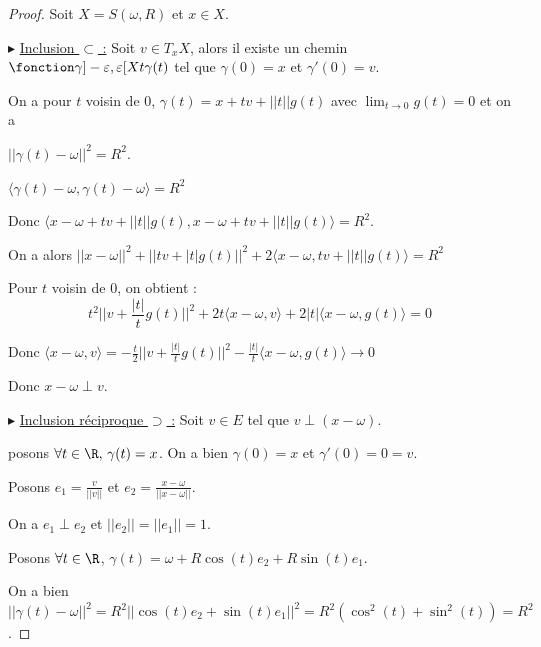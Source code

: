 \begin{proof}
    Soit $X = S(\omega, R)$ et $x \in X$.

    $\blacktriangleright$ \uline{Inclusion $\subset$ :} Soit $v \in T_xX$, alors il existe un chemin $\fonction \gamma {]- \varepsilon, \varepsilon[}{X}{t}{\gamma(t)}$
    tel que $\gamma(0) = x$ et $\gamma'(0) = v$.

    On a pour $t$ voisin de $0$, $\gamma(t) = x + t v + ||t|| g(t)$ avec
    $\displaystyle \lim_{t \to 0} g(t) = 0$ et on a 
    
    $||\gamma(t) - \omega||^2 = R^2$.

    $\langle \gamma(t) - \omega, \gamma(t) - \omega \rangle = R^2$

    Donc $\langle x - \omega + t v + ||t|| g(t), x - \omega + t v + ||t|| g(t) \rangle = R^2$. 

    On a alors $||x - \omega||^2 +  ||tv + |t| g(t)||^2 + 2 \langle x - \omega, t v + ||t|| g(t) \rangle = R^2$

    Pour $t$ voisin de $0$, on obtient : 
    $$t^2 ||v + \frac{|t|}{t} g(t)||^2 + 2 t \langle x - \omega, v \rangle + 2 |t| \langle x - \omega, g(t) \rangle = 0$$

    Donc $\langle x - \omega, v \rangle = - \frac t 2 ||v + \frac{|t|}{t} g(t)||^2 - \frac{|t|}{t} \langle x - \omega, g(t) \rangle \to 0$

    Donc $x- \omega \perp v$.

    \lvspace $\blacktriangleright$ \uline{Inclusion réciproque $\supset$ :} Soit $v \in E$ tel que 
    $v \perp (x - \omega)$. 
    
     posons $\forall t \in \R, \, \gamma(t) = x$. On a 
    bien $\gamma(0) = x$ et $\gamma'(0) = 0 = v$.


    Posons $e_1 = \frac{v}{||v||}$ et $e_2 = \frac{x - \omega}{||x - \omega||}$.

    On a $e_1 \perp e_2$ et $||e_2|| = ||e_1|| = 1$. 


    \lvspace \lvspace

    Posons $\forall t \in \R$, $\gamma(t) = \omega + R \cos(t) e_2 + R \sin(t) e_1$.

    On a bien $||\gamma(t) - \omega||^2 = R^2|| \cos(t) e_2 + \sin(t) e_1||^2 = R^2 (\cos^2(t) + \sin^2(t)) = R^2$.


\end{proof}
